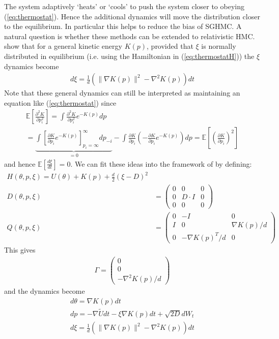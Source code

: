  The system adaptively `heats' or `cools' to push the system closer to obeying (\ref{eq:thermostat}). Hence the additional dynamics will move the distribution closer to the equilibrium. In particular this helps to reduce the bias of SGHMC. 
 A natural question is whether these methods can be extended to relativistic HMC. \cite{Leimkuhler2016} show that for a general kinetic energy $K(p)$, provided that $\xi$ is normally distributed in equilibrium (i.e. using the Hamiltonian in (\ref{eq:thermostatH})) the $\xi$ dynamics become
 \begin{eqnarray}
  d\xi = \frac{1}{d}\left(\|\nabla K(p)\|^2 - \nabla^2 K(p)\right)dt
 \end{eqnarray}
 Note that these general dynamics can still be interpreted as maintaining an equation like (\ref{eq:thermostat}) since
 \begin{eqnarray}
 \mathbb{E}\left[ \frac{\partial^2 K}{\partial p_i^2}\right] = \int \frac{\partial^2 K}{\partial p_i^2} e^{-K(p)} dp\\
= \underbrace{\int \left[\frac{\partial K}{\partial p_i} e^{-K(p)}\right]_{p_i=\infty}^\infty dp_{-i}}_{=0} - \int \frac{\partial K}{\partial p_i}\left(-\frac{\partial K}{\partial p_i} e^{-K(p)}\right) dp= \mathbb{E}\left[\left(\frac{\partial K}{\partial p_i}\right)^2\right]
 \end{eqnarray}
 and hence $\mathbb{E}\left[\frac{d\xi}{dt}\right]=0$.
We can fit these ideas into the framework of \cite{Ma2015} by defining:
 \begin{eqnarray}
H(\theta,p,\xi) = U(\theta) + K(p) + \frac{d}{2}(\xi -D)^2\\
D(\theta,p,\xi) &= \left(\begin{array}{ccc}
0 & 0 & 0\\
0 & D\cdot I & 0\\
0 & 0 & 0
\end{array}\right) \\
Q(\theta,p,\xi) &= \left(\begin{array}{ccc}
0 & -I & 0\\
I & 0 & \nabla K(p)/d\\
0 & -\nabla K(p)^T/d & 0
\end{array}\right)
\end{eqnarray}
 This gives
 \begin{eqnarray}
 \Gamma = \left(\begin{array}{c}
	0\\0\\-\nabla^2 K(p)/d
 \end{array}\right)
 \end{eqnarray}
 and the dynamics become
 \begin{eqnarray}
 	d\theta =  \nabla K(p) dt\\
	d p = -\nabla \tilde{U} dt - \xi \nabla K(p) dt + \sqrt{2D}dW_t\\
	d\xi =  \frac{1}{d}\left(\|\nabla K(p)\|^2 - \nabla^2 K(p)\right)dt
 \end{eqnarray}
 
